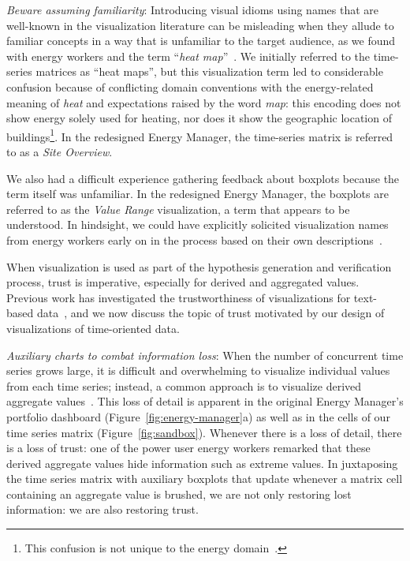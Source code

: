 \documentclass[journal]{vgtc}                %
\newcommand{\bstart}[1]{\vspace{1mm} \noindent{\textbf{#1:}}}
\newcommand{\jn}[1]{\textcolor{darkGreen}{#1}}
\begin{document}


{\it Beware assuming familiarity}: Introducing visual idioms using names that are well-known in the visualization literature can be misleading when they allude to familiar concepts in a way that is unfamiliar to the target audience, as we found with energy workers and the term ``{\it heat map}''~\cite{Field2015,Wilkinson2009}.
We initially referred to the time-series matrices as ``heat maps'', but this visualization term led to considerable confusion because of conflicting domain conventions with the energy-related meaning of {\it heat} and expectations raised by the word {\it map}: this encoding does not show energy solely used for heating, nor does it show the geographic location of buildings\footnote{This confusion is not unique to the energy domain~\cite{Field2015,Wilkinson2009}.}. 
In the redesigned Energy Manager, the time-series matrix is referred to as a {\it Site Overview}.

We also had a difficult experience gathering feedback about boxplots because the term itself was unfamiliar. 
In the redesigned Energy Manager, the boxplots are referred to as the {\it Value Range} visualization, a term that appears to be understood. %
In hindsight, we could have explicitly solicited visualization names from energy workers early on in the process based on their own descriptions~\cite{Metoyer2012}. 

\bstart{Trust} When visualization is used as part of the hypothesis generation and verification process, trust is imperative, especially for derived and aggregated values. %
Previous work has investigated the trustworthiness of visualizations for text-based data~\cite{Chuang2012}, and we now discuss the topic of trust motivated by our design of visualizations of time-oriented data.

{\it Auxiliary charts to combat information loss}: When the number of concurrent time series grows large, it is difficult and overwhelming to visualize individual values from each time series; instead, a common approach is to visualize derived aggregate values~\cite{McLachlan2008}.
This loss of detail is apparent in the original Energy Manager's portfolio dashboard (Figure~\ref{fig:energy-manager}a) as well as in the cells of our time series matrix (Figure~\ref{fig:sandbox}).
Whenever there is a loss of detail, there is a loss of trust: one of the power user energy workers remarked that these derived aggregate values hide information such as extreme values.
In juxtaposing the time series matrix with auxiliary boxplots that update whenever a matrix cell containing an aggregate value is brushed, we are not only restoring lost information: we are also restoring trust.
\end{document}
